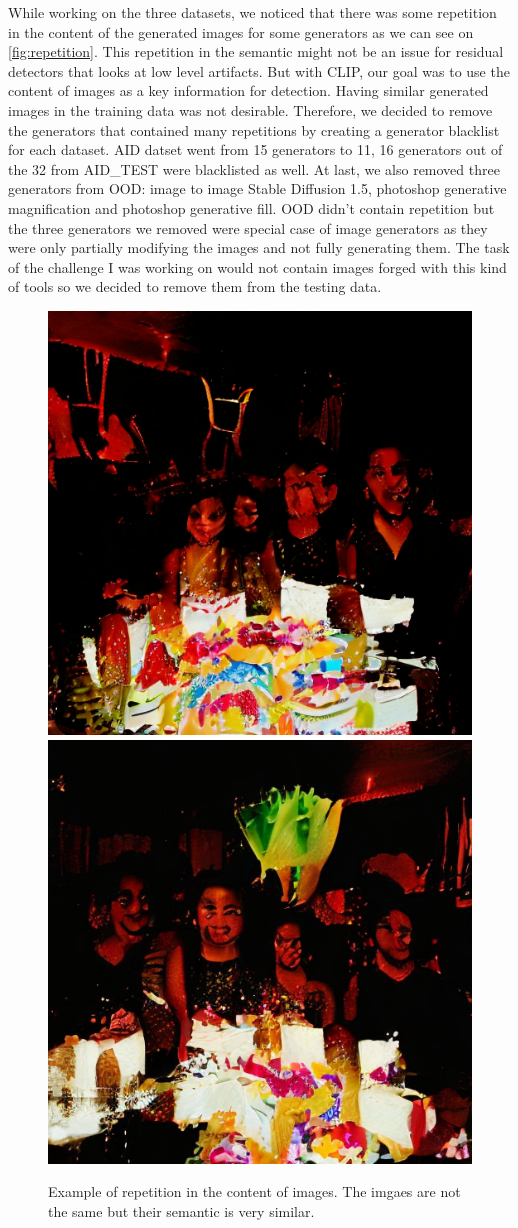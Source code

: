 \documentclass[12pt,a4paper]{article}
\begin{document}
While working on the three datasets, we noticed that there was some repetition in the content of the generated images for some generators as we can see on \autoref{fig:repetition}. This repetition in the semantic might not be an issue for residual detectors that looks at low level artifacts. But with CLIP, our goal was to use the content of images as a key information for detection. Having similar generated images in the training data was not desirable. Therefore, we decided to remove the generators that contained many repetitions by creating a generator blacklist for each dataset. AID datset went from 15 generators to 11, 16 generators out of the 32 from AID\_TEST were blacklisted as well. At last, we also removed three generators from OOD: image to image Stable Diffusion 1.5, photoshop generative magnification and photoshop generative fill. OOD didn't contain repetition but the three generators we removed were special case of image generators as they were only partially modifying the images and not fully generating them. The task of the challenge I was working on would not contain images forged with this kind of tools so we decided to remove them from the testing data.

\begin{figure}[H]
    \centering
    \includegraphics[width=.49\textwidth]{img/birthday1.png}
    \includegraphics[width=.49\textwidth]{img/birthday2.png}
    \caption{Example of repetition in the content of images. The imgaes are not the same but their semantic is very similar.}
    \label{fig:repetition}
\end{figure}
\end{document}
